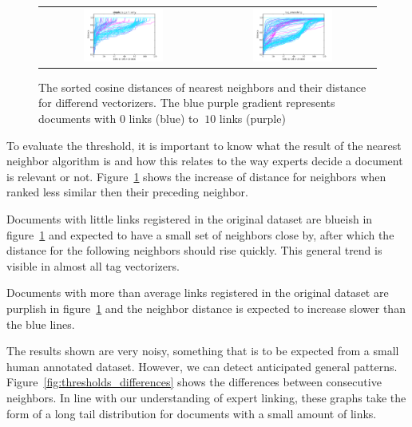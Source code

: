 \begin{figure}[h!]
\begin{tabular}{cc}
\includegraphics[width =0.5\textwidth]{images/thresh_cosine_simple_tag_similarity} 	& \includegraphics[width =0.5\textwidth]{images/thresh_cosine_tag_smoothing}
\end{tabular}
\caption{The sorted cosine distances of nearest neighbors and their distance for differend vectorizers. The blue purple gradient represents documents with 0 links (blue) to $\>10$ links (purple)}
\label{fig:thresholds}
\end{figure}

To evaluate the threshold, it is important to know what the result of the nearest neighbor 
algorithm is and how this relates to the way experts decide a document is relevant or 
not. Figure~\ref{fig:thresholds} shows the increase of distance for neighbors when ranked
less similar then their preceding neighbor.

Documents with little links registered in the original dataset are blueish in 
figure~\ref{fig:thresholds} and expected to have a small set of neighbors close 
by, after which the distance for the following neighbors should rise quickly. This 
general trend is visible in almost all tag vectorizers. 

Documents with more than average links registered in the original dataset are 
purplish in figure~\ref{fig:thresholds} and the neighbor distance is expected to increase
slower than the blue lines.

The results shown are very noisy, something that is to be expected from a small
human annotated dataset. However, we can detect anticipated general patterns.
Figure~\ref{fig:thresholds_differences} shows the differences between consecutive 
neighbors. In line with our understanding of expert linking, these graphs take the 
form of a long tail distribution for documents with a small amount of links.

